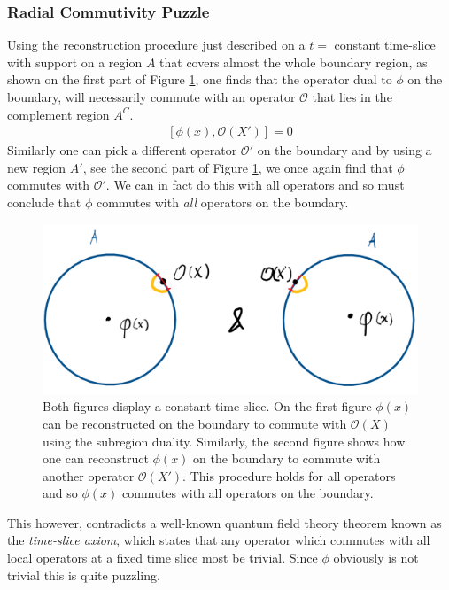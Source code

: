 \documentclass[letter,12pt]{article}
\newcommand{\BO}{\mathcal{O}}
\newcommand{\OO}{\mathcal{O}}
\begin{document}
\subsubsection*{Radial Commutivity Puzzle}
Using the reconstruction procedure just described on a $t=$ constant time-slice with support on a region $A$ that covers almost the whole boundary region, as shown on the first part of Figure \ref{fig:adscftfig3}, one finds that the operator dual to $\phi$ on the boundary, will necessarily commute with an operator $\OO$ that lies in the complement region $A^C$. 
\begin{equation}
	\begin{aligned}
		\left[\phi(x),\BO(X')\right]=0
	\end{aligned}
\end{equation}
Similarly one can pick a different operator $\OO '$ on the boundary and by using a new region $A'$, see the second part of Figure \ref{fig:adscftfig3}, we once again find that $\phi$ commutes with $\OO '$. We can in fact do this with all operators and so must conclude that $\phi$ commutes with \textit{all} operators on the boundary.
\begin{figure}[]
	\centering
	\includegraphics[width=0.75\linewidth]{ADS_CFT_Fig3}
	\caption{Both figures display a constant time-slice. On the first figure $\phi(x)$ can be reconstructed on the boundary to commute with $\OO(X)$ using the subregion duality. Similarly, the second figure shows how one can reconstruct $\phi(x)$ on the boundary to commute with another operator $\OO(X')$. This procedure holds for all operators and so $\phi(x)$ commutes with all operators on the boundary.}
	\label{fig:adscftfig3}
\end{figure}
This however, contradicts a well-known quantum field theory theorem known as the \textit{time-slice axiom}, which states that any operator which commutes with all local operators at a fixed time slice most be trivial. Since $\phi$ obviously is not trivial this is quite puzzling.
\end{document}

